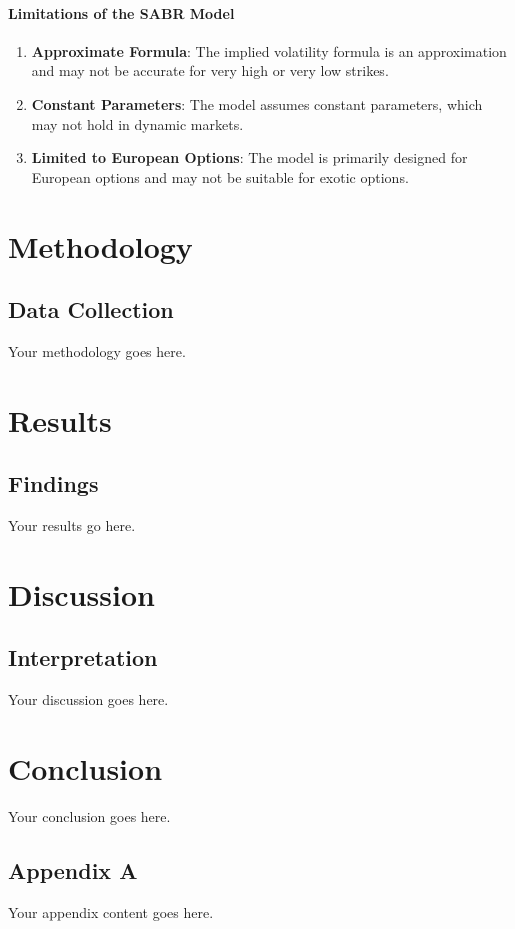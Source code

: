 \documentclass[11pt, oneside, a4paper, titlepage]{report}
\begin{document}
\subsubsection{Limitations of the SABR Model}

\begin{enumerate}
    \item \textbf{Approximate Formula}: The implied volatility formula is an approximation and may not be accurate for very high or very low strikes.
    \item \textbf{Constant Parameters}: The model assumes constant parameters, which may not hold in dynamic markets.
    \item \textbf{Limited to European Options}: The model is primarily designed for European options and may not be suitable for exotic options.
\end{enumerate}

\chapter{Methodology}
\section{Data Collection}
Your methodology goes here.

\chapter{Results}
\section{Findings}
Your results go here.

\chapter{Discussion}
\section{Interpretation}
Your discussion goes here.

\chapter{Conclusion}
Your conclusion goes here.




\begin{appendices}
\chapter{Appendix A}
Your appendix content goes here.
\end{appendices}
\end{document}
